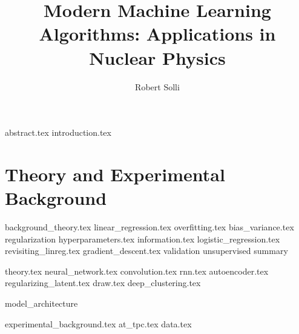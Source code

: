 \documentclass[12pt]{uiofysmaster}
\author{Robert Solli}
\title{Modern Machine Learning Algorithms: Applications in Nuclear Physics}
\begin{document}
\maketitle

\tableofcontents
\listoffigures
\listoftodos

\newpage

{abstract.tex}
{introduction.tex}

\part{Theory and Experimental Background}

{background_theory.tex}
{linear_regression.tex}
{overfitting.tex}
{bias_variance.tex}
{regularization}
{hyperparameters.tex}
{information.tex}
{logistic_regression.tex}
{revisiting_linreg.tex}
{gradient_descent.tex}
{validation}
{unsupervised}
{summary}

{theory.tex}
{neural_network.tex}
{convolution.tex}
{rnn.tex}
{autoencoder.tex}
{regularizing_latent.tex}
{draw.tex}
{deep_clustering.tex}

{model_architecture}


{experimental_background.tex}
{at_tpc.tex}
{data.tex}
\end{document}
